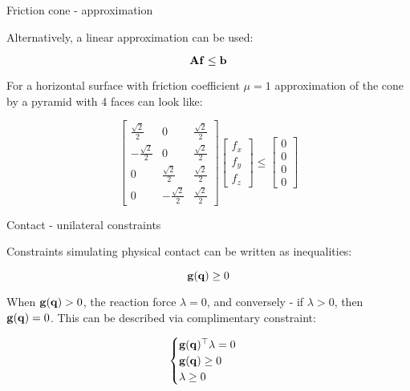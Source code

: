 \documentclass{beamer}
\begin{document}
\begin{frame}{Friction cone - approximation}
	\begin{flushleft}
		
		Alternatively, a linear approximation can be used:
		
		\begin{equation}
			\mathbf{A}\mathbf{f} \leq \mathbf{b}
		\end{equation}
	
	
	For a horizontal surface with friction coefficient $\mu = 1$ approximation of the cone by a pyramid with 4 faces can look like:
	
	\begin{equation}
		\begin{bmatrix}
			\frac{\sqrt{2}}{2} & 0 & \frac{\sqrt{2}}{2} \\
		   -\frac{\sqrt{2}}{2} & 0 & \frac{\sqrt{2}}{2} \\
		     0 &  \frac{\sqrt{2}}{2} & \frac{\sqrt{2}}{2} \\
		     0 & -\frac{\sqrt{2}}{2} & \frac{\sqrt{2}}{2}
		\end{bmatrix}
	\begin{bmatrix}
		f_x \\ f_y \\ f_z
	\end{bmatrix}
\leq
	\begin{bmatrix}
	0 \\ 0 \\ 0 \\ 0
	\end{bmatrix}
	\end{equation}		
		
	\end{flushleft}
\end{frame}



\begin{frame}{Contact - unilateral constraints}
	\begin{flushleft}
		
		Constraints simulating physical contact can be written as inequalities:
		
		\begin{equation}
			\mathbf{g} (\mathbf{q}) \geq 0
		\end{equation}
	
	    When $\mathbf{g} (\mathbf{q}) > 0$, the reaction force $\lambda = 0$, and conversely - if $\lambda > 0$, then $\mathbf{g} (\mathbf{q}) = 0$. This can be described via complimentary constraint:
	    
		\begin{equation}
			\begin{cases}
				\mathbf{g} (\mathbf{q})^\top \lambda = 0 \\
				\mathbf{g} (\mathbf{q}) \geq 0 \\
				\lambda \geq 0
			\end{cases}
		\end{equation}	    
		
		
		
	\end{flushleft}
\end{frame}
\end{document}
